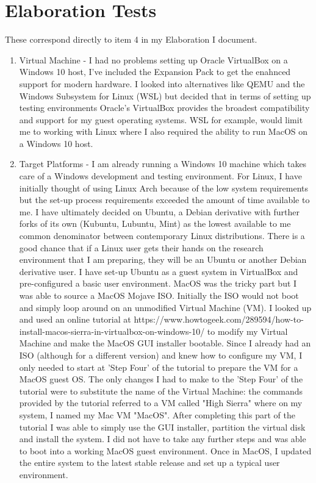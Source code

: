 \documentclass{article}
\begin{document}
\section{Elaboration Tests}
These correspond directly to item 4 in my Elaboration I document.
\begin{enumerate}
    \item Virtual Machine - I had no problems setting up Oracle VirtualBox on a Windows 10 host, I've included the Expansion Pack to get the enahnced support for modern hardware. I looked into alternatives like QEMU and the Windows Subsystem for Linux (WSL) but decided that in terms of setting up testing environments Oracle's VirtualBox provides the broadest compatibility and support for my guest operating systems. WSL for example, would limit me to working with Linux where I also required the ability to run MacOS on a Windows 10 host.
    \item Target Platforms - I am already running a Windows 10 machine which takes care of a Windows development and testing environment. \newline For Linux, I have initially thought of using Linux Arch because of the low system requirements but the set-up process requirements exceeded the amount of time available to me. I have ultimately decided on Ubuntu, a Debian derivative with further forks of its own (Kubuntu, Lubuntu, Mint) as the lowest available to me common denominator between contemporary Linux distributions. There is a good chance that if a Linux user gets their hands on the research environment that I am preparing, they will be an Ubuntu or another Debian derivative user. I have set-up Ubuntu as a guest system in VirtualBox and pre-configured a basic user environment. \newline MacOS was the tricky part but I was able to source a MacOS Mojave ISO. Initially the ISO would not boot and simply loop around on an unmodified Virtual Machine (VM). I looked up and used an online tutorial at https://www.howtogeek.com/289594/how-to-install-macos-sierra-in-virtualbox-on-windows-10/ to modify my Virtual Machine and make the MacOS GUI installer bootable. Since I already had an ISO (although for a different version) and knew how to configure my VM, I only needed to start at 'Step Four' of the tutorial to prepare the VM for a MacOS guest OS. The only changes I had to make to the 'Step Four' of the tutorial were to substitute the name of the Virtual Machine: the commands provided by the tutorial referred to a VM called "High Sierra" where on my system, I named my Mac VM "MacOS". After completing this part of the tutorial I was able to simply use the GUI installer, partition the virtual disk and install the system. I did not have to take any further steps and was able to boot into a working MacOS guest environment. Once in MacOS, I updated the entire system to the latest stable release and set up a typical user environment.

\end{enumerate}
\end{document}

